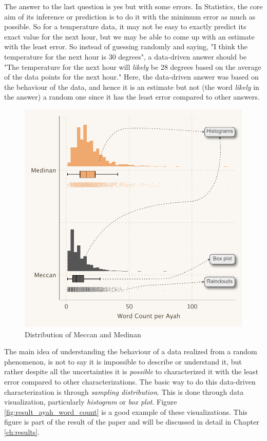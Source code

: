 The answer to the last question is yes but with some errors. In Statistics, the core aim of its inference or prediction is to do it with the minimum error as much as possible. So for a temperature data, it may not be easy to exactly predict its exact value for the next hour, but we may be able to come up with an estimate with the least error. So instead of guessing randomly and saying, "I think the temperature for the next hour is 30 degrees", a data-driven answer should be "The temperature for the next hour will \textit{likely} be 28 degrees based on the average of the data points for the next hour." Here, the data-driven answer was based on the behaviour of the data, and hence it is an estimate but not (the word \textit{likely} in the answer) a random one since it has the least error compared to other answers.

\begin{figure}[!t]
    \centering
    \includegraphics[width=\textwidth]{img/plot3.pdf}
    \caption{Distribution of Meccan and Medinan  }
    \label{fig:result_ayah_word_count_aggregated}
\end{figure}

The main idea of understanding the behaviour of a data realized from a random phenomenon, is not to say it is impossible to describe or understand it, but rather despite all the uncertainties it is \textit{possible} to characterized it with the least error compared to other characterizations. The basic way to do this data-driven characterization is through \textit{sampling distribution}. This is done through data visualization, particularly \textit{histogram} or \textit{box plot}. Figure \ref{fig:result_ayah_word_count} is a good example of these visualizations. This figure is part of the result of the paper and will be discussed in detail in Chapter \ref{ch:results}. 


